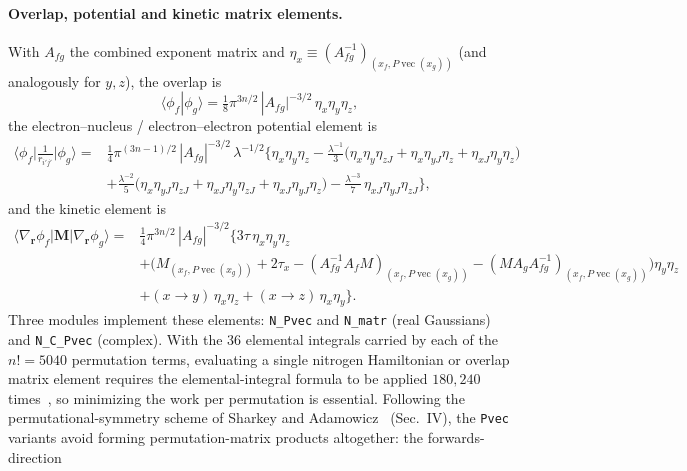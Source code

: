 \documentclass[11pt]{article}
\newcommand{\rvec}{\mathbf{r}}
\newcommand{\vecop}{\operatorname{vec}}
\begin{document}
\paragraph{Overlap, potential and kinetic matrix elements.}
With $A_{fg}$ the combined exponent matrix and
$\eta_x\equiv (A_{fg}^{-1})_{(x_f,P\vecop(x_g))}$ (and analogously for $y,z$),
the overlap is~\cite{Sharkey2014}
\begin{equation}
\langle\phi_f|\phi_g\rangle=\tfrac{1}{8}\pi^{3n/2}\,|A_{fg}|^{-3/2}\,
\eta_x\eta_y\eta_z,
\end{equation}
the electron--nucleus / electron--electron potential element is
\begin{equation}
\begin{aligned}
\Big\langle\phi_f\Big|\tfrac{1}{r_{i'j'}}\Big|\phi_g\Big\rangle=&
\tfrac{1}{4}\pi^{(3n-1)/2}\,|A_{fg}|^{-3/2}\,\lambda^{-1/2}
\Big\{\eta_x\eta_y\eta_z
-\tfrac{\lambda^{-1}}{3}\big(\eta_x\eta_y\eta_{zJ}+\eta_x\eta_{yJ}\eta_z+\eta_{xJ}\eta_y\eta_z\big)\\
&+\tfrac{\lambda^{-2}}{5}\big(\eta_x\eta_{yJ}\eta_{zJ}+\eta_{xJ}\eta_y\eta_{zJ}+\eta_{xJ}\eta_{yJ}\eta_z\big)
-\tfrac{\lambda^{-3}}{7}\,\eta_{xJ}\eta_{yJ}\eta_{zJ}\Big\},
\end{aligned}
\end{equation}
and the kinetic element is
\begin{equation}
\begin{aligned}
\langle\nabla_\rvec\phi_f|\mathbf{M}|\nabla_\rvec\phi_g\rangle=&
\tfrac{1}{4}\pi^{3n/2}\,|A_{fg}|^{-3/2}\Big\{3\tau\,\eta_x\eta_y\eta_z\\
&+\big(M_{(x_f,P\vecop(x_g))}+2\tau_x-(A_{fg}^{-1}A_fM)_{(x_f,P\vecop(x_g))}-(MA_gA_{fg}^{-1})_{(x_f,P\vecop(x_g))}\big)\eta_y\eta_z\\
&+(x\!\to\!y)\,\eta_x\eta_z+(x\!\to\!z)\,\eta_x\eta_y\Big\}.
\end{aligned}
\end{equation}
Three modules implement these elements: \texttt{N\_Pvec} and \texttt{N\_matr}
(real Gaussians) and \texttt{N\_C\_Pvec} (complex). With the $36$ elemental
integrals carried by each of the $n!=5040$ permutation terms, evaluating a single
nitrogen Hamiltonian or overlap matrix element requires the elemental-integral
formula to be applied $180{,}240$ times~\cite{Sharkey2014}, so minimizing the work
per permutation is essential. Following the permutational-symmetry scheme of
Sharkey and Adamowicz~\cite{Sharkey2014} (Sec.~IV), the \texttt{Pvec} variants
avoid forming permutation-matrix products altogether: the forwards-direction
\end{document}
